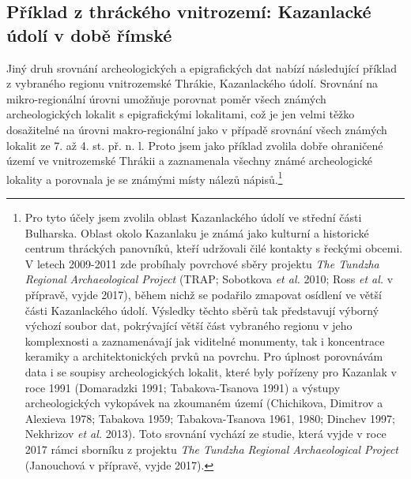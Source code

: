 
\subsection[příklad-z-thráckého-vnitrozemí-kazanlacké-údolí-v-době-římské]{Příklad z thráckého vnitrozemí: Kazanlacké údolí v době římské}

Jiný druh srovnání archeologických a epigrafických dat nabízí následující příklad z vybraného regionu vnitrozemské Thrákie, Kazanlackého údolí. Srovnání na mikro-regionální úrovni umožňuje porovnat poměr všech známých archeologických lokalit s epigrafickými lokalitami, což je jen velmi těžko dosažitelné na úrovni makro-regionální jako v případě srovnání všech známých lokalit ze 7. až 4. st. př. n. l. Proto jsem jako příklad zvolila dobře ohraničené území ve vnitrozemské Thrákii a zaznamenala všechny známé archeologické lokality a porovnala je se známými místy nálezů nápisů.\footnote{Pro tyto účely jsem zvolila oblast Kazanlackého údolí ve střední části Bulharska. Oblast okolo Kazanlaku je známá jako kulturní a historické centrum thráckých panovníků, kteří udržovali čilé kontakty s řeckými obcemi. V letech 2009-2011 zde probíhaly povrchové sběry projektu {\em The Tundzha Regional Archaeological Project} (TRAP; Sobotkova {\em et al.} 2010; Ross {\em et al.} v přípravě, vyjde 2017), během nichž se podařilo zmapovat osídlení ve větší části Kazanlackého údolí. Výsledky těchto sběrů tak představují výborný výchozí soubor dat, pokrývající větší část vybraného regionu v jeho komplexnosti a zaznamenávají jak viditelné monumenty, tak i koncentrace keramiky a architektonických prvků na povrchu. Pro úplnost porovnávám data i se soupisy archeologických lokalit, které byly pořízeny pro Kazanlak v roce 1991 (Domaradzki 1991; Tabakova-Tsanova 1991) a výstupy archeologických vykopávek na zkoumaném území (Chichikova, Dimitrov a Alexieva 1978; Tabakova 1959; Tabakova-Tsanova 1961, 1980; Dinchev 1997; Nekhrizov {\em et al.} 2013). Toto srovnání vychází ze studie, která vyjde v roce 2017 rámci sborníku z projektu {\em The Tundzha Regional Archaeological Project} (Janouchová v přípravě, vyjde 2017).}

